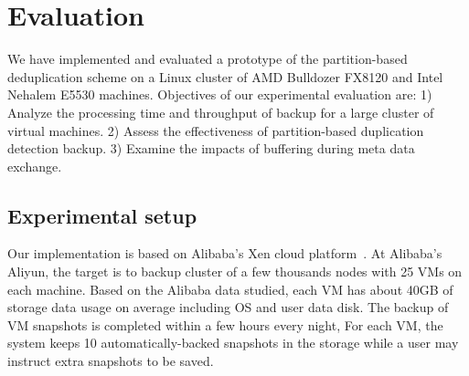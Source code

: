 
\section{Evaluation}
\label{sect:exper}

We have implemented and evaluated a prototype of the partition-based deduplication scheme on a Linux cluster
of AMD Bulldozer FX8120 and Intel Nehalem E5530 machines.  Objectives of our experimental evaluation are:
1) Analyze the processing time and throughput of backup for a large cluster of virtual machines.
2) Assess the effectiveness  of partition-based duplication detection 
backup.  3) Examine the impacts of buffering during meta data exchange.

\subsection{Experimental setup}

Our implementation is based on Alibaba's Xen cloud platform~\cite{Aliyun,WeiZhangIEEE}.  
At Alibaba's Aliyun, the  target is to backup cluster of a few thousands nodes with 25 VMs on each machine.
Based on the Alibaba data studied,  each VM has about  40GB of storage  data usage on average
including OS and user data disk.  The backup of VM snapshots is completed within a few  hours every night,
For each VM, the system keeps 10 automatically-backed snapshots in the storage while
a user may instruct extra snapshots to be saved.



